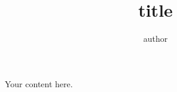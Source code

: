 \documentclass{article}
\title{{{title}}}
\author{{{author}}}
\begin{document}
\maketitle

Your content here.
\end{document}
